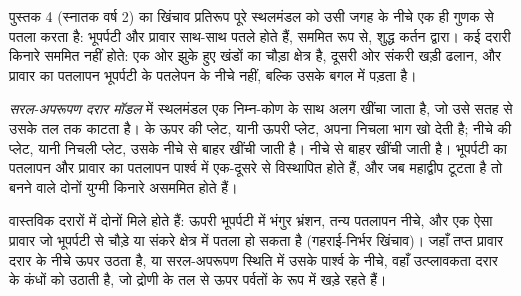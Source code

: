 पुस्तक 4 (स्नातक वर्ष 2) का खिंचाव प्रतिरूप पूरे स्थलमंडल को उसी जगह के नीचे
एक ही गुणक से पतला करता है: भूपर्पटी और प्रावार साथ-साथ पतले होते हैं,
सममित रूप से, शुद्ध कर्तन द्वारा। कई दरारी किनारे सममित नहीं होते: एक ओर
झुके हुए खंडों का चौड़ा क्षेत्र है, दूसरी ओर संकरी खड़ी ढलान, और
प्रावार का पतलापन भूपर्पटी के पतलेपन के नीचे नहीं, बल्कि उसके बगल में पड़ता है।

\begin{definition}\label{def:b3:extension-strike-slip:rift-models}
\emph{सरल-अपरूपण दरार मॉडल} में स्थलमंडल
एक निम्न-कोण  के साथ अलग खींचा जाता है, जो उसे
सतह से उसके तल तक काटता है।  के ऊपर की प्लेट, यानी ऊपरी प्लेट, अपना निचला
भाग खो देती है; नीचे की प्लेट, यानी निचली प्लेट, उसके नीचे से बाहर खींची जाती है।
नीचे से बाहर खींची जाती है। भूपर्पटी का पतलापन और प्रावार का पतलापन पार्श्व में
एक-दूसरे से विस्थापित होते हैं, और जब महाद्वीप टूटता है तो बनने वाले दोनों युग्मी
किनारे असममित होते हैं।
\end{definition}

वास्तविक दरारों में दोनों मिले होते हैं: ऊपरी भूपर्पटी में भंगुर भ्रंशन, तन्य पतलापन
नीचे, और एक ऐसा प्रावार जो भूपर्पटी से चौड़े या संकरे क्षेत्र में पतला हो सकता है
(गहराई-निर्भर खिंचाव)। जहाँ तप्त प्रावार दरार के नीचे ऊपर उठता है, या
सरल-अपरूपण स्थिति में उसके पार्श्व के नीचे, वहाँ उत्प्लावकता दरार के कंधों को उठाती है,
जो द्रोणी के तल से ऊपर पर्वतों के रूप में खड़े रहते हैं।

